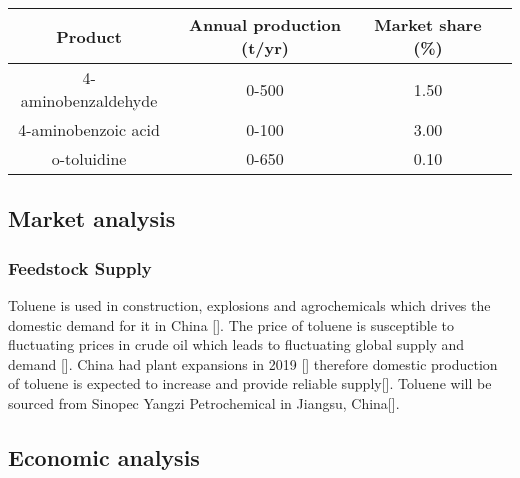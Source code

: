 \begin{center}
\begin{tabular}{ |c|c|c|c| } 
\hline
Product & Annual production (t/yr) & Market share (\%) \\
\hline
4-aminobenzaldehyde & 0-500 & 1.50 \\ 
4-aminobenzoic acid & 0-100 & 3.00 \\ 
o-toluidine & 0-650 & 0.10 \\ 
\hline
\end{tabular}
\end{center}

\subsection{Market analysis}

\subsubsection{Feedstock Supply}
Toluene is used in construction, explosions and agrochemicals which drives the domestic demand for it in China []. The price of toluene is susceptible to fluctuating prices in crude oil which leads to fluctuating global supply and demand []. China had plant expansions in 2019 [] therefore domestic production of toluene is expected to increase and provide reliable supply[]. Toluene will be sourced from Sinopec Yangzi Petrochemical in Jiangsu, China[].


\subsection{Economic analysis}